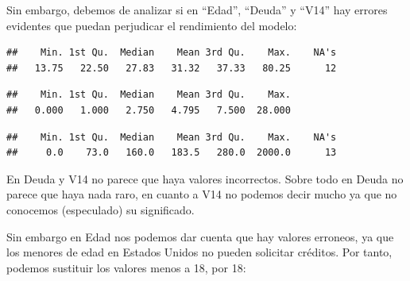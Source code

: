 \documentclass[
]{article}
\newenvironment{Shaded}{\begin{snugshade}}{\end{snugshade}}
\newcommand{\FunctionTok}[1]{\textcolor[rgb]{0.13,0.29,0.53}{\textbf{#1}}}
\newcommand{\NormalTok}[1]{#1}
\newcommand{\SpecialCharTok}[1]{\textcolor[rgb]{0.81,0.36,0.00}{\textbf{#1}}}
\begin{document}
Sin embargo, debemos de analizar si en ``Edad'', ``Deuda'' y ``V14'' hay
errores evidentes que puedan perjudicar el rendimiento del modelo:

\begin{Shaded}
\end{Shaded}

\begin{verbatim}
##    Min. 1st Qu.  Median    Mean 3rd Qu.    Max.    NA's 
##   13.75   22.50   27.83   31.32   37.33   80.25      12
\end{verbatim}

\begin{Shaded}
\end{Shaded}

\begin{verbatim}
##    Min. 1st Qu.  Median    Mean 3rd Qu.    Max. 
##   0.000   1.000   2.750   4.795   7.500  28.000
\end{verbatim}

\begin{Shaded}
\end{Shaded}

\begin{verbatim}
##    Min. 1st Qu.  Median    Mean 3rd Qu.    Max.    NA's 
##     0.0    73.0   160.0   183.5   280.0  2000.0      13
\end{verbatim}

En Deuda y V14 no parece que haya valores incorrectos. Sobre todo en
Deuda no parece que haya nada raro, en cuanto a V14 no podemos decir
mucho ya que no conocemos (especulado) su significado.

Sin embargo en Edad nos podemos dar cuenta que hay valores erroneos, ya
que los menores de edad en Estados Unidos no pueden solicitar créditos.
Por tanto, podemos sustituir los valores menos a 18, por 18:
\end{document}
